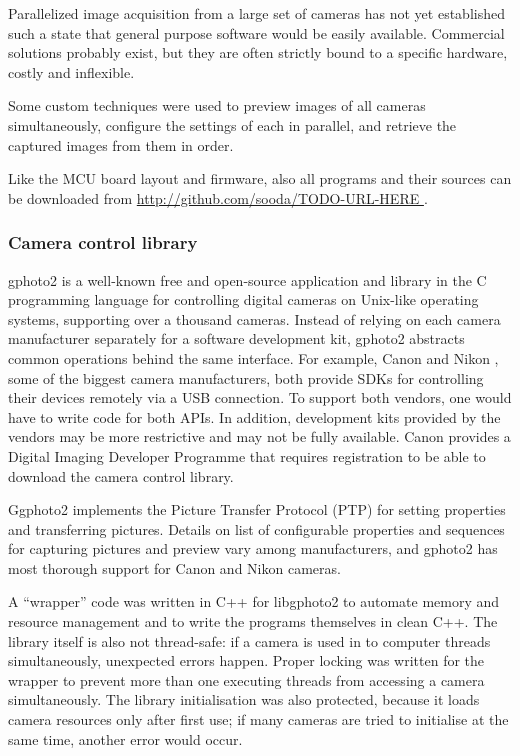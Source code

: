 Parallelized image acquisition from a large set of cameras has not yet established such a state that general purpose software would be easily available.
Commercial solutions probably exist, but they are often strictly bound to a specific hardware, costly and inflexible.

Some custom techniques were used to preview images of all cameras simultaneously, configure the settings of each in parallel, and retrieve the captured images from them in order.

Like the MCU board layout and firmware, also all programs and their sources can be downloaded from \url { http://github.com/sooda/TODO-URL-HERE }.


\subsubsection{Camera control library} %

gphoto2 \cite{gphoto2} is a well-known free and open-source application and library in the C programming language for controlling digital cameras on Unix-like operating systems, supporting over a thousand cameras.
Instead of relying on each camera manufacturer separately for a software development kit, gphoto2 abstracts common operations behind the same interface.
For example, Canon \cite{canonsdk} and Nikon \cite{nikonsdk}, some of the biggest camera manufacturers, both provide SDKs for controlling their devices remotely via a USB connection.
To support both vendors, one would have to write code for both APIs.
In addition, development kits provided by the vendors may be more restrictive and may not be fully available.
Canon provides a Digital Imaging Developer Programme that requires registration to be able to download the camera control library.

Ggphoto2 implements the Picture Transfer Protocol (PTP) \cite{ptpTODO} for setting properties and transferring pictures.
Details on list of configurable properties and sequences for capturing pictures and preview vary among manufacturers, and gphoto2 has most thorough support for Canon and Nikon cameras.

A ``wrapper'' code was written in C++ for libgphoto2 to automate memory and resource management and to write the programs themselves in clean C++.
The library itself is also not thread-safe: if a camera is used in to computer threads simultaneously, unexpected errors happen.
Proper locking was written for the wrapper to prevent more than one executing threads from accessing a camera simultaneously.
The library initialisation was also protected, because it loads camera resources only after first use; if many cameras are tried to initialise at the same time, another error would occur.



